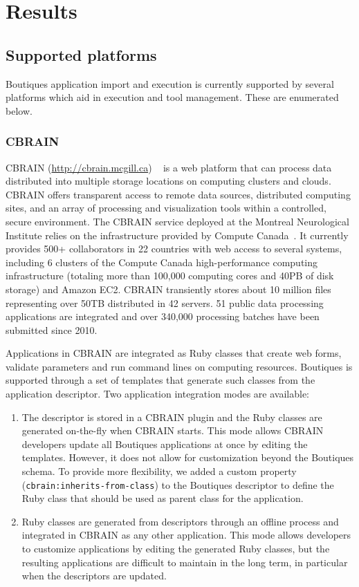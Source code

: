 \documentclass[a4paper,num-refs]{oup-contemporary}
\newcommand{\boutiques}{Boutiques\xspace}
\begin{document}
\section{Results}
\label{sec:results}

\subsection{Supported platforms}

\boutiques application import and execution is currently supported by several
platforms which aid in execution and tool management. These are enumerated
below.

\subsubsection{CBRAIN}

CBRAIN (\url{http://cbrain.mcgill.ca}) ~\cite{SHER-14} is a web
platform that can process data distributed into multiple storage
locations on computing clusters and clouds. CBRAIN offers transparent
access to remote data sources, distributed computing sites, and an
array of processing and visualization tools within a controlled,
secure environment.  The CBRAIN service deployed at the Montreal
Neurological Institute relies on the infrastructure provided by
Compute Canada~\cite{das2016mni}. It currently provides 500+
collaborators in 22 countries with web access to several systems,
including 6 clusters of the Compute Canada high-performance computing
infrastructure (totaling more than 100,000 computing cores and 40PB of
disk storage) and Amazon EC2. CBRAIN transiently stores about 10
million files representing over 50TB distributed in 42 servers. 51
public data processing applications are integrated and over 340,000
processing batches have been submitted since 2010.

Applications in CBRAIN are integrated as Ruby classes that create web
forms, validate parameters and run command lines on computing
resources. \boutiques is supported through a set of templates that
generate such classes from the application descriptor. Two application
integration modes are available:
\begin{enumerate}
  \item The descriptor is stored in a CBRAIN plugin and the Ruby
    classes are generated on-the-fly when CBRAIN starts. This mode
    allows CBRAIN developers update all \boutiques applications at
    once by editing the templates. However, it does not allow for
    customization beyond the \boutiques schema. To provide more
    flexibility, we added a custom property
    (\texttt{cbrain:inherits-from-class}) to the \boutiques descriptor
    to define the Ruby class that should be used as parent class for
    the application.
  \item Ruby classes are generated from descriptors
    through an offline process and integrated in CBRAIN as any other
    application. This mode allows developers to customize applications
    by editing the generated Ruby classes, but the resulting
    applications are difficult to maintain in the long term, in
    particular when the descriptors are updated.
\end{enumerate}
\end{document}
